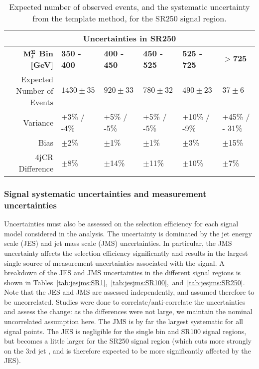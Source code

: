 \begin{table}[!ht]
\begin{center}\renewcommand\arraystretch{1.6}
\begin{tabular}{r|l |l |l |l |l }

  
\multicolumn{6}{c}{Uncertainties in SR250} \\
\hline \hline

$\mathbf{M_{\textrm{J}}^{\Sigma}}$ \textbf{Bin [GeV]}  & \textbf{350 - 400} & \textbf{400 - 450} & \textbf{450 - 525} & \textbf{525 - 725} & $\mathbf{>725}$ \\ \cline{2-6}
\hline
 Expected Number of Events & $1430\pm35$ & $920\pm33$ & $780\pm32$ & $490\pm23$ & $37\pm6$ \\
 Variance & +3\% / -4\% & +5\% / -5\% & +5\% / -5\% & +10\% / -9\% & +45\% / - 31\% \\
 Bias & $\pm$2\% & $\pm$1\% & $\pm$1\% & $\pm$3\% & $\pm$15\% \\
 4jCR Difference & $\pm$8\% & $\pm$14\% & $\pm$11\% & $\pm$10\% & $\pm$7\% \\
 \hline \hline
  \end{tabular}
  
  \caption{Expected number of observed events, and the systematic uncertainty from the template method, for the SR250 signal region. \label{tab:backSR250}}
\end{center}
\end{table}





\subsubsection{Signal systematic uncertainties and measurement uncertainties}

Uncertainties must also be assessed on the selection efficiency for each signal model considered in the analysis. The uncertainty is dominated by the jet energy scale (JES) and jet mass scale (JMS) uncertainties. In particular, the JMS uncertainty affects the selection efficiency significantly and results in the largest single source of measurement uncertainties associated with the signal. A breakdown of the JES and JMS uncertainties in the different signal regions is shown in Tables~\ref{tab:jesjms:SR1},~\ref{tab:jesjms:SR100},~and~\ref{tab:jesjms:SR250}. 
%
Note that the JES and JMS are assessed independently, and assumed therefore to be uncorrelated. Studies were done to correlate/anti-correlate the uncertainties and assess the change: as the differences were not large, we maintain the nominal uncorrelated assumption here.
%
The JMS is by far the largest systematic for all signal points. The JES is negligible for the single bin and SR100 signal regions, but becomes a little larger for the SR250 signal region (which cuts more strongly on the 3rd jet \pT, and is therefore expected to be more significantly affected by the JES).

